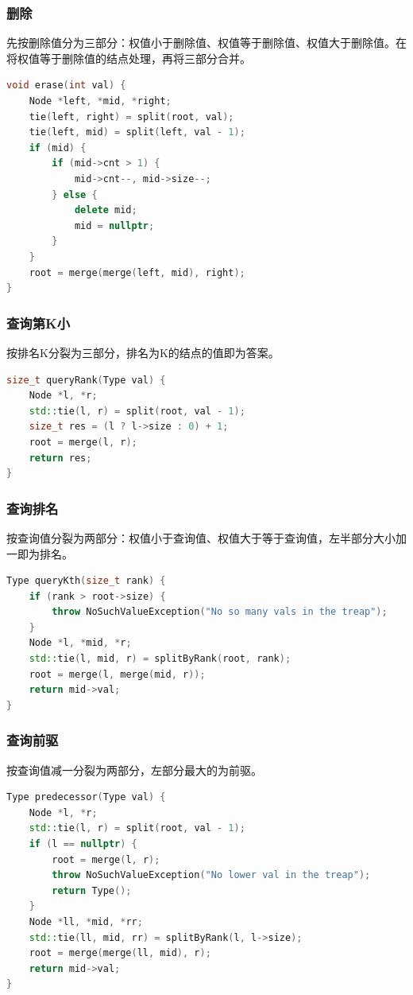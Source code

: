 \documentclass[utf8]{ctexbeamer}
\begin{document}
    \begin{frame}[fragile]
        \frametitle{删除}
        先按删除值分为三部分：权值小于删除值、权值等于删除值、权值大于删除值。在将权值等于删除值的结点处理，再将三部分合并。
        \begin{lstlisting}[language=c++]
void erase(int val) {
    Node *left, *mid, *right;
    tie(left, right) = split(root, val);
    tie(left, mid) = split(left, val - 1);
    if (mid) {
        if (mid->cnt > 1) {
            mid->cnt--, mid->size--;
        } else {
            delete mid;
            mid = nullptr;
        }
    }
    root = merge(merge(left, mid), right);
}
        \end{lstlisting}
    \end{frame}

    \begin{frame}[fragile]
        \frametitle{查询第K小}
        按排名K分裂为三部分，排名为K的结点的值即为答案。
        \begin{lstlisting}[language=c++]
size_t queryRank(Type val) {
    Node *l, *r;
    std::tie(l, r) = split(root, val - 1);
    size_t res = (l ? l->size : 0) + 1;
    root = merge(l, r);
    return res;
}
        \end{lstlisting}
    \end{frame}

    \begin{frame}[fragile]
        \frametitle{查询排名}
        按查询值分裂为两部分：权值小于查询值、权值大于等于查询值，左半部分大小加一即为排名。
        \begin{lstlisting}[language=c++]
Type queryKth(size_t rank) {
    if (rank > root->size) {
        throw NoSuchValueException("No so many vals in the treap");
    }
    Node *l, *mid, *r;
    std::tie(l, mid, r) = splitByRank(root, rank);
    root = merge(l, merge(mid, r));
    return mid->val;
}          
        \end{lstlisting}
    \end{frame}

    \begin{frame}[fragile]
        \frametitle{查询前驱}
        按查询值减一分裂为两部分，左部分最大的为前驱。
        \begin{lstlisting}[language=c++]
Type predecessor(Type val) {
    Node *l, *r;
    std::tie(l, r) = split(root, val - 1);
    if (l == nullptr) {
        root = merge(l, r);
        throw NoSuchValueException("No lower val in the treap");
        return Type();
    }
    Node *ll, *mid, *rr;
    std::tie(ll, mid, rr) = splitByRank(l, l->size);
    root = merge(merge(ll, mid), r);
    return mid->val;
}
        \end{lstlisting}
    \end{frame}
\end{document}
